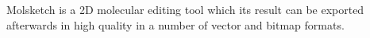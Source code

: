 Molsketch is a 2D molecular editing tool which its result can be exported afterwards in high quality in a number of vector and bitmap formats.